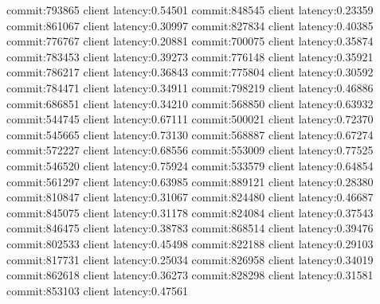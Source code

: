 commit:793865 client latency:0.54501
commit:848545 client latency:0.23359
commit:861067 client latency:0.30997
commit:827834 client latency:0.40385
commit:776767 client latency:0.20881
commit:700075 client latency:0.35874
commit:783453 client latency:0.39273
commit:776148 client latency:0.35921
commit:786217 client latency:0.36843
commit:775804 client latency:0.30592
commit:784471 client latency:0.34911
commit:798219 client latency:0.46886
commit:686851 client latency:0.34210
commit:568850 client latency:0.63932
commit:544745 client latency:0.67111
commit:500021 client latency:0.72370
commit:545665 client latency:0.73130
commit:568887 client latency:0.67274
commit:572227 client latency:0.68556
commit:553009 client latency:0.77525
commit:546520 client latency:0.75924
commit:533579 client latency:0.64854
commit:561297 client latency:0.63985
commit:889121 client latency:0.28380
commit:810847 client latency:0.31067
commit:824480 client latency:0.46687
commit:845075 client latency:0.31178
commit:824084 client latency:0.37543
commit:846475 client latency:0.38783
commit:868514 client latency:0.39476
commit:802533 client latency:0.45498
commit:822188 client latency:0.29103
commit:817731 client latency:0.25034
commit:826958 client latency:0.34019
commit:862618 client latency:0.36273
commit:828298 client latency:0.31581
commit:853103 client latency:0.47561